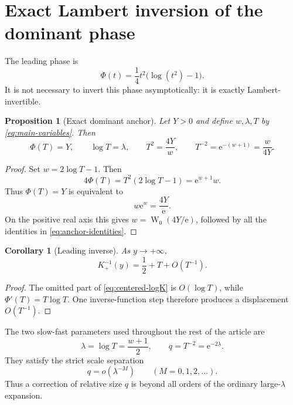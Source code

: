 \documentclass[11pt,oneside]{article}
\theoremstyle{plain}
\newtheorem{proposition}[theorem]{Proposition}
\newtheorem{corollary}[theorem]{Corollary}
\theoremstyle{definition}
\theoremstyle{remark}
\newcommand{\W}{\operatorname{W}}
\newcommand{\e}{\mathrm{e}}
\begin{document}
\section{Exact Lambert inversion of the dominant phase}
\label{sec:Lambert-anchor}

The leading phase is
\begin{equation}
 \Phi(t)=\frac14t^2\bigl(\log(t^2)-1\bigr).
 \label{eq:Phi-alt}
\end{equation}
It is not necessary to invert this phase asymptotically: it is exactly
Lambert-invertible.

\begin{proposition}[Exact dominant anchor]
\label{prop:exact-anchor}
Let \(Y>0\) and define \(w,\lambda,T\) by \cref{eq:main-variables}.  Then
\begin{equation}
 \Phi(T)=Y,
 \qquad \log T=\lambda,
 \qquad T^2=\frac{4Y}{w},
 \qquad T^{-2}=\e^{-(w+1)}=\frac{w}{4Y}.
 \label{eq:anchor-identities}
\end{equation}
\end{proposition}

\begin{proof}
Set \(w=2\log T-1\).  Then
\begin{equation}
 4\Phi(T)=T^2(2\log T-1)=\e^{w+1}w.
\end{equation}
Thus \(\Phi(T)=Y\) is equivalent to
\begin{equation}
 w\e^w=\frac{4Y}{\e}.
\end{equation}
On the positive real axis this gives \(w=\W_0(4Y/\e)\), followed by all the
identities in \cref{eq:anchor-identities}.
\end{proof}

\begin{corollary}[Leading inverse]
\label{cor:leading-inverse}
As \(y\to+\infty\),
\begin{equation}
 K_+^{-1}(y)=\frac12+T+O(T^{-1}).
 \label{eq:leading-inverse}
\end{equation}
\end{corollary}

\begin{proof}
The omitted part of \cref{eq:centered-logK} is \(O(\log T)\), while
\(\Phi'(T)=T\log T\).  One inverse-function step therefore produces a
displacement \(O(T^{-1})\).
\end{proof}

The two slow-fast parameters used throughout the rest of the article are
\begin{equation}
 \lambda=\log T=\frac{w+1}{2},
 \qquad q=T^{-2}=\e^{-2\lambda}.
 \label{eq:lambda-q}
\end{equation}
They satisfy the strict scale separation
\begin{equation}
 q=o(\lambda^{-M})\qquad(M=0,1,2,\ldots).
 \label{eq:q-beyond-all-orders}
\end{equation}
Thus a correction of relative size \(q\) is beyond all orders of the ordinary
large-\(\lambda\) expansion.
\end{document}
